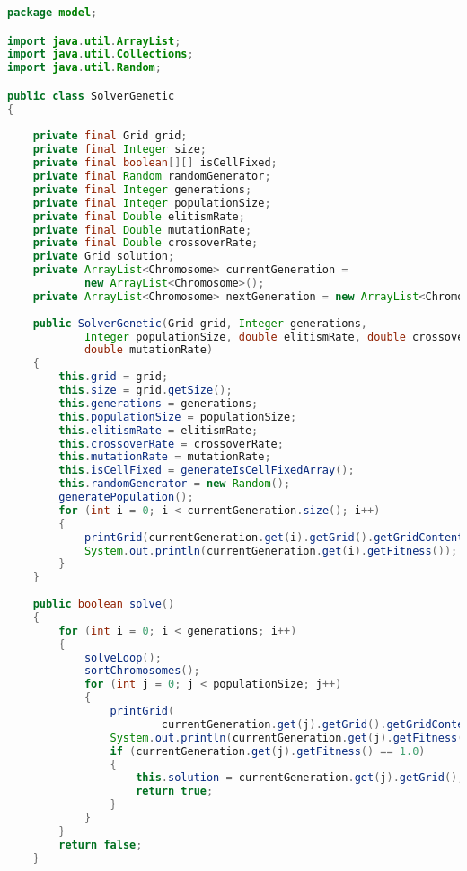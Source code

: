 \begin{lstlisting}[language=Java,basicstyle=\tiny,caption=SolverGenetic.java]
package model;

import java.util.ArrayList;
import java.util.Collections;
import java.util.Random;

public class SolverGenetic
{
    
    private final Grid grid;
    private final Integer size;
    private final boolean[][] isCellFixed;
    private final Random randomGenerator;
    private final Integer generations;
    private final Integer populationSize;
    private final Double elitismRate;
    private final Double mutationRate;
    private final Double crossoverRate;
    private Grid solution;
    private ArrayList<Chromosome> currentGeneration = 
            new ArrayList<Chromosome>();
    private ArrayList<Chromosome> nextGeneration = new ArrayList<Chromosome>();
    
    public SolverGenetic(Grid grid, Integer generations, 
            Integer populationSize, double elitismRate, double crossoverRate, 
            double mutationRate)
    {
        this.grid = grid;
        this.size = grid.getSize();
        this.generations = generations;
        this.populationSize = populationSize;
        this.elitismRate = elitismRate;
        this.crossoverRate = crossoverRate;
        this.mutationRate = mutationRate;
        this.isCellFixed = generateIsCellFixedArray();
        this.randomGenerator = new Random(); 
        generatePopulation();
        for (int i = 0; i < currentGeneration.size(); i++)
        {
            printGrid(currentGeneration.get(i).getGrid().getGridContents());
            System.out.println(currentGeneration.get(i).getFitness());
        }
    }
    
    public boolean solve()
    {
        for (int i = 0; i < generations; i++)
        {
            solveLoop();
            sortChromosomes();
            for (int j = 0; j < populationSize; j++)
            {
                printGrid(
                        currentGeneration.get(j).getGrid().getGridContents());
                System.out.println(currentGeneration.get(j).getFitness());
                if (currentGeneration.get(j).getFitness() == 1.0)
                {
                    this.solution = currentGeneration.get(j).getGrid();
                    return true;
                }
            }
        }
        return false;
    }


\end{lstlisting}
